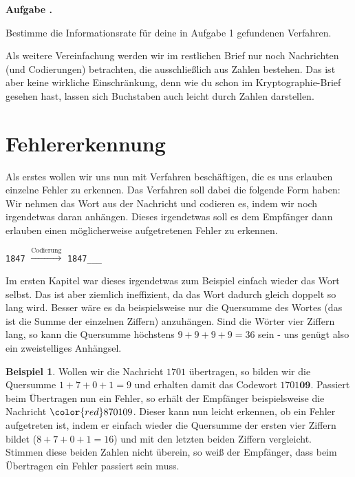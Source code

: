 \documentclass[a4paper,ngerman,12pt]{scrartcl}
\newcommand{\red}[1]{{\color{red}#1}}
\theoremstyle{definition}
\newtheorem{bsp}[defn]{Beispiel}
\theoremstyle{plain}
\theoremstyle{remark}
\newlength{\aufgabenskip}
\newcounter{aufgabennummer}
\newenvironment{aufgabe}[1]{
	\addtocounter{aufgabennummer}{1}
	\textbf{Aufgabe \theaufgabennummer.} \emph{#1} \par
}{\vspace{\aufgabenskip}}
\begin{document}
\begin{aufgabe}{}\label{aufgabe:verdreifachungsCodierungIR}
	Bestimme die Informationsrate für deine in Aufgabe 1 gefundenen Verfahren.
\end{aufgabe}

Als weitere Vereinfachung werden wir im restlichen Brief nur noch Nachrichten (und Codierungen) betrachten, die ausschließlich aus Zahlen bestehen. Das ist aber keine wirkliche Einschränkung, denn wie du schon im Kryptographie-Brief gesehen hast, lassen sich Buchstaben auch leicht durch Zahlen darstellen.


\section{Fehlererkennung}

Als erstes wollen wir uns nun mit Verfahren beschäftigen, die es uns erlauben einzelne Fehler zu erkennen. Das Verfahren soll dabei die folgende Form haben: Wir nehmen das Wort aus der Nachricht und codieren es, indem wir noch \glqq irgendetwas\grqq{} daran anhängen. Dieses \glqq irgendetwas\grqq{} soll es dem Empfänger dann erlauben einen möglicherweise aufgetretenen Fehler zu erkennen.
	\begin{center}
		\texttt{1847} $\xrightarrow{\text{Codierung}}$ \texttt{1847\_\_\_}
	\end{center}

Im ersten Kapitel war dieses \glqq irgendetwas\grqq{} zum Beispiel einfach wieder das Wort selbst. Das ist aber ziemlich ineffizient, da das Wort dadurch gleich doppelt so lang wird. Besser wäre es da beispielsweise nur die Quersumme des Wortes (das ist die Summe der einzelnen Ziffern) anzuhängen. Sind die Wörter vier Ziffern lang, so kann die Quersumme höchstens $9+9+9+9=36$ sein - uns genügt also ein zweistelliges Anhängsel.

\begin{bsp}
	Wollen wir die Nachricht $1701$ übertragen, so bilden wir die Quersumme $1+7+0+1=9$ und erhalten damit das Codewort $1701\textbf{09}$. Passiert beim Übertragen nun ein Fehler, so erhält der Empfänger beispielsweise die Nachricht $\red{8}70109$. Dieser kann nun leicht erkennen, ob ein Fehler aufgetreten ist, indem er einfach wieder die Quersumme der ersten vier Ziffern bildet ($8+7+0+1=16$) und mit den letzten beiden Ziffern vergleicht. Stimmen diese beiden Zahlen nicht überein, so weiß der Empfänger, dass beim Übertragen ein Fehler passiert sein muss.
\end{bsp}
\end{document}
